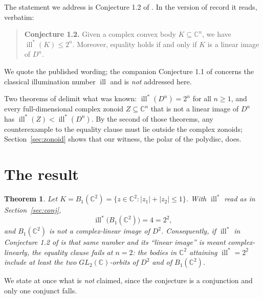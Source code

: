 \documentclass[11pt]{amsart}
\newtheorem{theorem}{Theorem}
\theoremstyle{remark}
\DeclareMathOperator{\ill}{ill}
\newcommand{\CC}{\mathbb{C}}
\newcommand{\illstar}{\ill^{*}}
\begin{document}
The statement we address is Conjecture 1.2 of \cite{RSS}. In the version of
record it reads, verbatim:

\begin{quote}
\textbf{Conjecture 1.2.} Given a complex convex body $K\subseteq\CC^{n}$, we
have $\ill^{*}(K)\le 2^{n}$. Moreover, equality holds if and only if $K$ is a
linear image of $D^{n}$.
\end{quote}

\noindent
We quote the published wording; the companion Conjecture 1.1 of \cite{RSS}
concerns the classical illumination number $\ill$ and is \emph{not} addressed
here.

Two theorems of \cite{RSS} delimit what was known: $\illstar(D^{n})=2^{n}$ for
all $n\ge1$, and every full-dimensional complex zonoid
$Z\subseteq\CC^{n}$ that is not a linear image of $D^{n}$ has
$\illstar(Z)<\illstar(D^{n})$. By the second of those theorems, any
counterexample to the equality clause must lie outside the complex zonoids;
Section~\ref{sec:zonoid} shows that our witness, the polar of the polydisc,
does.

\section{The result}\label{sec:result}

\begin{theorem}\label{thm:main}
Let $K=B_{1}(\CC^{2})=\{z\in\CC^{2}:|z_{1}|+|z_{2}|\le1\}$. With $\illstar$ read
as in Section~\ref{sec:conj},
\[
  \illstar\bigl(B_{1}(\CC^{2})\bigr)=4=2^{2},
\]
and $B_{1}(\CC^{2})$ is not a complex-linear image of $D^{2}$. Consequently, if
$\illstar$ in Conjecture 1.2 of \textup{\cite{RSS}} is that same number and its
``linear image'' is meant complex-linearly, the equality clause fails at $n=2$:
the bodies in $\CC^{2}$ attaining $\illstar=2^{2}$ include at least the two
$GL_{2}(\CC)$-orbits of $D^{2}$ and of $B_{1}(\CC^{2})$.
\end{theorem}

We state at once what is \emph{not} claimed, since the conjecture is a
conjunction and only one conjunct falls.
\end{document}
